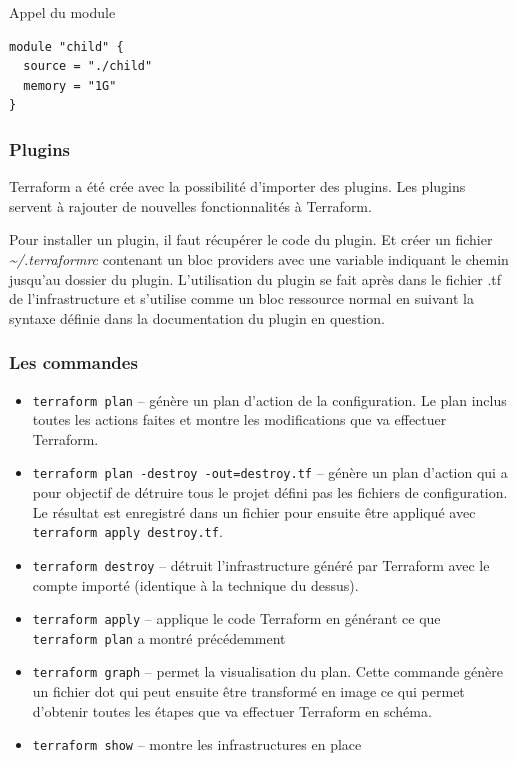 \documentclass[]{article}
\providecommand{\tightlist}{%
  \setlength{\itemsep}{0pt}\setlength{\parskip}{0pt}}
\begin{document}
Appel du module
\begin{verbatim}
module "child" {
  source = "./child"
  memory = "1G"
}
\end{verbatim}


\subsubsection{Plugins}\label{plugins}

Terraform a été crée avec la possibilité d'importer des plugins.
Les plugins servent à rajouter de nouvelles fonctionnalités à Terraform.

Pour installer un plugin, il faut récupérer le code du plugin. Et créer un
fichier \emph{\textasciitilde{}/.terraformrc} contenant un bloc
providers avec une variable indiquant le chemin jusqu'au dossier du
plugin. L'utilisation du plugin se fait après dans le fichier .tf de
l’infrastructure et s'utilise comme un bloc ressource normal en suivant
la syntaxe définie dans la documentation du plugin en question.

\subsubsection{Les commandes}\label{les-commandes}

\begin{itemize}
\tightlist
\item
  \texttt{terraform\ plan} -- génère un plan d'action de la
  configuration. Le plan inclus toutes les actions faites et montre les
  modifications que va effectuer Terraform.
\item
  \texttt{terraform\ plan\ -destroy\ -out=destroy.tf} -- génère un plan
  d'action qui a pour objectif de détruire tous le projet défini pas les
  fichiers de configuration. Le résultat est enregistré dans un fichier
  pour ensuite être appliqué avec \texttt{terraform\ apply\ destroy.tf}.
\item
  \texttt{terraform\ destroy} -- détruit l'infrastructure généré par
  Terraform avec le compte importé (identique à la technique du dessus).
\item
  \texttt{terraform\ apply} -- applique le code Terraform en générant ce
  que \texttt{terraform\ plan} a montré précédemment
\item
  \texttt{terraform\ graph} -- permet la visualisation du plan. Cette
  commande génère un fichier dot qui peut ensuite être transformé en
  image ce qui permet d'obtenir toutes les étapes que va
  effectuer Terraform en schéma.
\item
  \texttt{terraform\ show} -- montre les infrastructures en place
\end{itemize}
\end{document}

